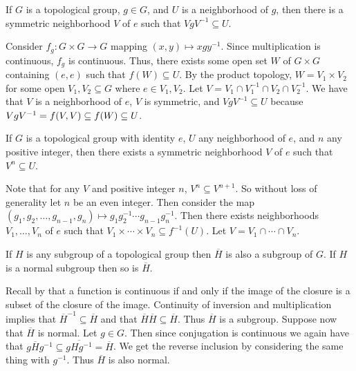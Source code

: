 \documentclass[letterpaper, 11pt, oneside]{book}
\begin{document}
\begin{prop}\label{prop: symmetric_VgV-1}
  If $G$ is a topological group, $g \in G$, and $U$ is a neighborhood of $g$, then there is a symmetric neighborhood $V$ of $e$ such that $VgV^{-1} \subseteq U$.
\end{prop}
\begin{pf}
  Consider $f_{g}\colon G \times G \to G$ mapping $(x, y) \mapsto xgy^{-1}$.
  Since multiplication is continuous, $f_{g}$ is continuous.
  Thus, there exists some open set $W$ of $G \times G$ containing $(e, e)$ such that $f(W) \subseteq U$.
  By the product topology, $W = V_1 \times V_{2}$ for some open $V_{1}, V_{2} \subseteq G$ where $e \in V_{1}, V_{2}$.
  Let $V = V_{1} \cap V_{1}^{-1} \cap V_{2} \cap V_{2}^{-1}$.
  We have that $V$ is a neighborhood of $e$, $V$ is symmetric, and $VgV^{-1} \subseteq U$ because $VgV^{-1} = f\pqty{V, V} \subseteq f(W) \subseteq U$.
\end{pf}

\begin{prop}
  If $G$ is a topological group with identity $e$, $U$ any neighborhood of $e$, and $n$ any positive integer, then there exists a symmetric neighborhood $V$ of $e$ such that $V^{n} \subseteq U$.
\end{prop}
\begin{pf}
  Note that for any $V$ and positive integer $n$, $V^{n} \subseteq V^{n + 1}$.
  So without loss of generality let $n$ be an even integer.
  Then consider the map $(g_{1}, g_{2}, \ldots, g_{n - 1}, g_{n}) \mapsto g_{1} g_{2}^{-1} \cdots g_{n - 1} g_{n}^{-1}$.
  Then there exists neighborhoods $V_{1}, \ldots, V_{n}$ of $e$ such that $V_{1} \times \cdots \times V_{n} \subseteq f^{-1}(U)$.
  Let $V = V_{1} \cap \cdots \cap V_{n}$.
\end{pf}

\begin{prop}
  If $H$ is any subgroup of a topological group then $\overline{H}$ is also a subgroup of $G$.
  If $H$ is a normal subgroup then so is $\overline{H}$.
\end{prop}
\begin{pf}
  Recall by  that a function is continuous if and only if the image of the closure is a subset of the closure of the image.
  Continuity of inversion and multiplication implies that $\overline{H}^{-1} \subseteq \overline{H}$ and that $\overline{H} \overline{H} \subseteq \overline{H}$.
  Thus $\overline{H}$ is a subgroup.
  Suppose now that $\overline{H}$ is normal.
  Let $g \in G$.
  Then since conjugation is continuous we again have that $g\overline{H}g^{-1} \subseteq \overline{gHg^{-1}} = \overline{H}$.
  We get the reverse inclusion by considering the same thing with $g^{-1}$.
  Thus $\overline{H}$ is also normal.
\end{pf}
\end{document}
